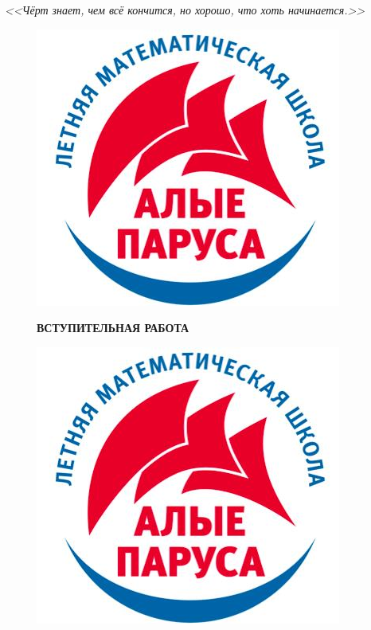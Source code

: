 \documentclass[12 pt, a4paper]{article}%
\begin{document}
	\newpage
	\begin{flushright}
		\textit{<<Чёрт знает, чем всё кончится, но хорошо, что хоть начинается.>>}
	\end{flushright}
	\begin{figure}[t]
		\begin{minipage}[h]{0.33\linewidth}
			\includegraphics[width=0.33\linewidth, left]{logo.jpg}
		\end{minipage}
		\begin{minipage}[h]{0.33\linewidth}
				\centering
			\large{\textbf{ВСТУПИТЕЛЬНАЯ РАБОТА}}\\
		\end{minipage}
		\begin{minipage}[h]{0.33\linewidth}
			\includegraphics[width=0.33\linewidth, right]{logo.jpg}
		\end{minipage}
		\label{ris:image1}
	\end{figure}
	
\end{document}
